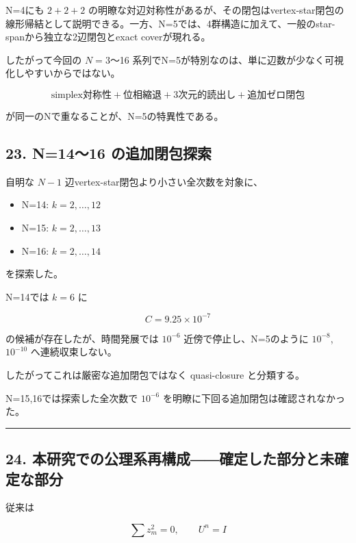 \documentclass[
  a4paper,
]{ltjsarticle}
\providecommand{\tightlist}{%
  \setlength{\itemsep}{0pt}\setlength{\parskip}{0pt}}
\begin{document}
N=4にも \(2+2+2\)
の明瞭な対辺対称性があるが、その閉包はvertex-star閉包の線形帰結として説明できる。一方、N=5では、4群構造に加えて、一般のstar-spanから独立な2辺閉包とexact
coverが現れる。

したがって今回の \(N=3\)〜16
系列でN=5が特別なのは、単に辺数が少なく可視化しやすいからではない。

\[
\boxed{
\text{simplex対称性}
+
\text{位相縮退}
+
\text{3次元的読出し}
+
\text{追加ゼロ閉包}
}
\]

が同一のNで重なることが、N=5の特異性である。

\subsection{23. N=14〜16
の追加閉包探索}\label{n1416-ux306eux8ffdux52a0ux9589ux5305ux63a2ux7d22}

自明な \(N-1\) 辺vertex-star閉包より小さい全次数を対象に、

\begin{itemize}
\tightlist
\item
  N=14: \(k=2,\ldots,12\)
\item
  N=15: \(k=2,\ldots,13\)
\item
  N=16: \(k=2,\ldots,14\)
\end{itemize}

を探索した。

N=14では \(k=6\) に

\[
C=9.25\times10^{-7}
\]

の候補が存在したが、時間発展では \(10^{-6}\) 近傍で停止し、N=5のように
\(10^{-8}\), \(10^{-10}\) へ連続収束しない。

したがってこれは厳密な追加閉包ではなく quasi-closure と分類する。

N=15,16では探索した全次数で \(10^{-6}\)
を明瞭に下回る追加閉包は確認されなかった。

\begin{center}\rule{0.5\linewidth}{0.5pt}\end{center}

\subsection{24.
本研究での公理系再構成――確定した部分と未確定な部分}\label{ux672cux7814ux7a76ux3067ux306eux516cux7406ux7cfbux518dux69cbux6210ux78baux5b9aux3057ux305fux90e8ux5206ux3068ux672aux78baux5b9aux306aux90e8ux5206}

従来は

\[
\sum z_m^2=0,
\qquad
U^n=I
\]
\end{document}
